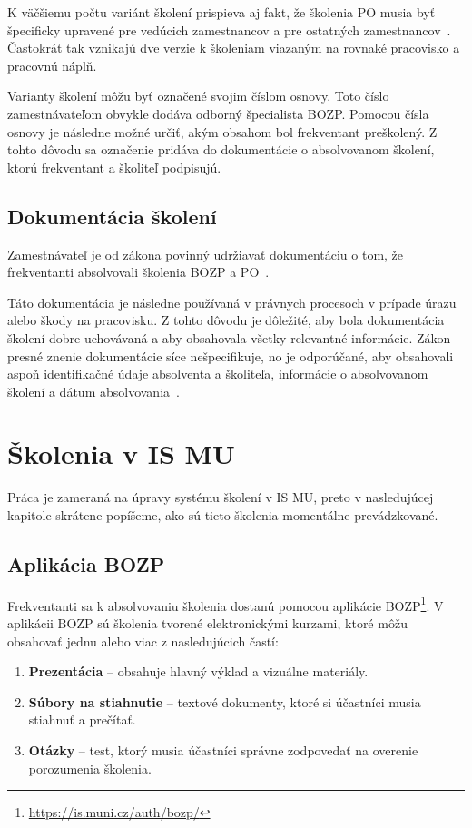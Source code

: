 \documentclass[
  digital,     %
  oneside,     %
  nosansbold,  %
  nocolorbold, %
  lof,         %
  nolot,         %
]{fithesis4}
\begin{document}
K väčšiemu počtu variánt školení prispieva aj fakt, že školenia PO musia byť špecificky upravené pre vedúcich zamestnancov a pre ostatných zamestnancov~\cite[~§16~odst.~2]{cesko_zakon_pozarni_ochrana}. Častokrát tak vznikajú dve verzie k školeniam viazaným na rovnaké pracovisko a pracovnú náplň.

Varianty školení môžu byť označené svojim číslom osnovy. Toto číslo zamestnávateľom obvykle dodáva odborný špecialista BOZP. Pomocou čísla osnovy je následne možné určiť, akým obsahom bol frekventant preškolený. Z tohto dôvodu sa označenie pridáva do dokumentácie o absolvovanom školení, ktorú frekventant a školiteľ podpisujú.

\section{Dokumentácia školení}
Zamestnávateľ je od zákona povinný udržiavať dokumentáciu o tom, že frekventanti absolvovali školenia BOZP a PO~\cites[§~103~odst.~3]{cesko_zakonik_prace}[§~27]{cesko_vyhlaska_poziarna_prevence}.

Táto dokumentácia je následne používaná v právnych procesoch v prípade úrazu alebo škody na pracovisku. Z tohto dôvodu je dôležité, aby bola dokumentácia školení dobre uchovávaná a aby obsahovala všetky relevantné informácie. Zákon presné znenie dokumentácie síce nešpecifikuje, no je odporúčané, aby obsahovali aspoň identifikačné údaje absolventa a školiteľa, informácie o absolvovanom školení a dátum absolvovania~\cite{prevent_bozp}.

\chapter{Školenia v IS MU}
\label{kap-2}
Práca je zameraná na úpravy systému školení v IS MU, preto v nasledujúcej kapitole skrátene popíšeme, ako sú tieto školenia momentálne prevádzkované. 

\section{Aplikácia BOZP}
Frekventanti sa k absolvovaniu školenia dostanú pomocou aplikácie BOZP\footnote{\url{https://is.muni.cz/auth/bozp/}}. V aplikácii BOZP sú školenia tvorené elektronickými kurzami, ktoré môžu obsahovať jednu alebo viac z nasledujúcich častí:
\begin{enumerate}
    \item \textbf{Prezentácia} – obsahuje hlavný výklad a vizuálne materiály.
    \item \textbf{Súbory na stiahnutie} – textové dokumenty, ktoré si účastníci musia stiahnuť a prečítať.
    \item \textbf{Otázky} – test, ktorý musia účastníci správne zodpovedať na overenie porozumenia školenia.~\cite[19]{kandova2019}
\end{enumerate}
\end{document}
